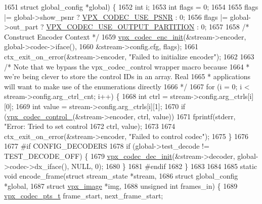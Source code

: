 \begin{DoxyCodeInclude}
{{{{{{{{{{{{{{{{{{{{{{{{{{{{{{{{{{{{{{{{{{{{{{1651                                \textcolor{keyword}{struct} global\_config *global) \{
1652   \textcolor{keywordtype}{int} i;
1653   \textcolor{keywordtype}{int} flags = 0;
1654 
1655   flags |= global->show\_psnr ? \hyperlink{group__encoder_ga57bb9eb1881c7e4bf86580660a5e40a0}{VPX\_CODEC\_USE\_PSNR} : 0;
1656   flags |= global->out\_part ? \hyperlink{group__encoder_gac26cd92b3719953aa0fbb0ff8c1d9c8d}{VPX\_CODEC\_USE\_OUTPUT\_PARTITION} : 0;
1657 
1658   \textcolor{comment}{/* Construct Encoder Context */}
1659   \hyperlink{group__encoder_ga3d490a2a9a6acd7c9ef82a603155f3cf}{vpx\_codec\_enc\_init}(&stream->encoder, global->codec->iface(),
1660                      &stream->config.cfg, flags);
1661   ctx\_exit\_on\_error(&stream->encoder, \textcolor{stringliteral}{"Failed to initialize encoder"});
1662 
1663   \textcolor{comment}{/* Note that we bypass the vpx\_codec\_control wrapper macro because}
1664 \textcolor{comment}{   * we're being clever to store the control IDs in an array. Real}
1665 \textcolor{comment}{   * applications will want to make use of the enumerations directly}
1666 \textcolor{comment}{   */}
1667   \textcolor{keywordflow}{for} (i = 0; i < stream->config.arg\_ctrl\_cnt; i++) \{
1668     \textcolor{keywordtype}{int} ctrl = stream->config.arg\_ctrls[i][0];
1669     \textcolor{keywordtype}{int} value = stream->config.arg\_ctrls[i][1];
1670     \textcolor{keywordflow}{if} (\hyperlink{group__codec_gaf7849b69cc390b21d889c8c71f69ec14}{vpx\_codec\_control\_}(&stream->encoder, ctrl, value))
1671       fprintf(stderr, \textcolor{stringliteral}{"Error: Tried to set control %
1672               ctrl, value);
1673 
1674     ctx\_exit\_on\_error(&stream->encoder, \textcolor{stringliteral}{"Failed to control codec"});
1675   \}
1676 
1677 \textcolor{preprocessor}{#if CONFIG\_DECODERS}
1678   \textcolor{keywordflow}{if} (global->test\_decode != TEST\_DECODE\_OFF) \{
1679     \hyperlink{group__decoder_ga8c2f0b12f1bd4927eb3c68b01eab19d3}{vpx\_codec\_dec\_init}(&stream->decoder, global->codec->dx\_iface(), NULL, 0);
1680   \}
1681 \textcolor{preprocessor}{#endif}
1682 \}
1683 
1684 
1685 \textcolor{keyword}{static} \textcolor{keywordtype}{void} encode\_frame(\textcolor{keyword}{struct} stream\_state  *stream,
1686                          \textcolor{keyword}{struct} global\_config *global,
1687                          \textcolor{keyword}{struct} \hyperlink{structvpx__image}{vpx\_image}     *img,
1688                          \textcolor{keywordtype}{unsigned} \textcolor{keywordtype}{int}          frames\_in) \{
1689   \hyperlink{group__encoder_ga7e711b0a71c65aef8f0faea8bd57b05f}{vpx\_codec\_pts\_t} frame\_start, next\_frame\_start;
}}}}}}}}}}}}}}}}}}}}}}}}}}}}}}}}}}}}}}}}}}}}}}}
\end{DoxyCodeInclude}
